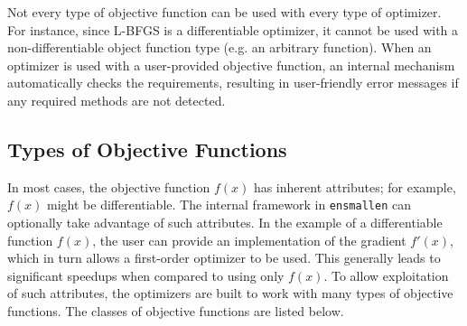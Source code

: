 Not every type of objective function can be used with every type of optimizer.
For instance, since L-BFGS is a differentiable optimizer,
it cannot be used with a non-differentiable object function type
(e.g. an arbitrary function).
When an optimizer is used with a user-provided objective function,
an internal mechanism automatically checks the requirements,
resulting in user-friendly error messages if any required methods are not detected.




\subsection{Types of Objective Functions}

In most cases, the objective function $f(x)$ has inherent attributes;
for example, $f(x)$ might be differentiable.
The internal framework in {\tt ensmallen} can optionally take advantage of such attributes.
In the example of a differentiable function $f(x)$,
the user can provide an implementation of the gradient $f'(x)$,
which in turn allows a first-order optimizer to be used.  This generally leads
to significant speedups when compared to using only $f(x)$.
To allow exploitation of such attributes, the optimizers are built to work with
many types of objective functions.  The classes of objective functions
are listed below.

